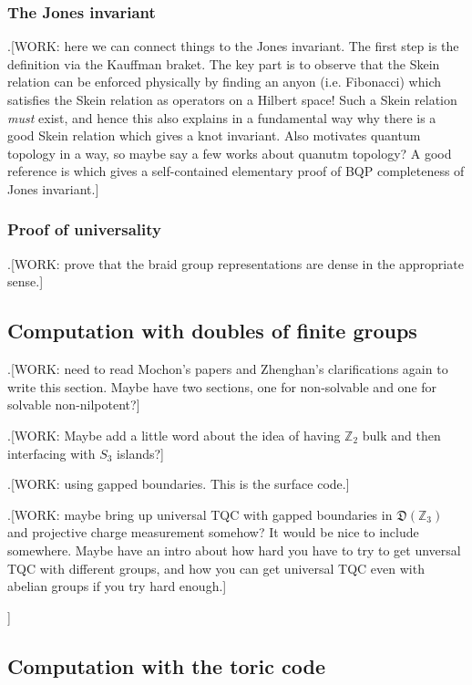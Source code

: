 \documentclass{article}
\theoremstyle{definition}
\newcommand{\ZZ}{\mathbb{Z}}
\newcommand{\DD}{\mathfrak{D}}
\newcommand{\0}{\left|0\right>}
\newcommand{\1}{\left|1\right>}
\numberwithin{figure}{section}
\begin{document}
\subsubsection{The Jones invariant}

.[WORK: here we can connect things to the Jones invariant. The first step is the definition via the Kauffman braket. The key part is to observe that the Skein relation can be enforced physically by finding an anyon (i.e. Fibonacci) which satisfies the Skein relation as operators on a Hilbert space! Such a Skein relation \textit{must} exist, and hence this also explains in a fundamental way why there is a good Skein relation which gives a knot invariant. Also motivates quantum topology in a way, so maybe say a few works about quanutm topology? A good reference is \cite{aharonov2011bqp} which gives a self-contained elementary proof of BQP completeness of Jones invariant.]

\subsubsection{Proof of universality}

.[WORK: prove that the braid group representations are dense in the appropriate sense.]

\subsection{Computation with doubles of finite groups}

.[WORK: need to read Mochon's papers and Zhenghan's clarifications again to write this section. Maybe have two sections, one for non-solvable and one for solvable non-nilpotent?]

.[WORK: Maybe add a little word about the idea of having $\ZZ_2$ bulk and then interfacing with $S_3$ islands?]

.[WORK: using gapped boundaries. This is the surface code.]

.[WORK: maybe bring up universal TQC with gapped boundaries in $\DD(\ZZ_3)$ and projective charge measurement somehow? It would be nice to include somewhere. Maybe have an intro about how hard you have to try to get unversal TQC with different groups, and how you can get universal TQC even with abelian groups if you try hard enough.]

]
\subsection{Computation with the toric code}
\end{document}
